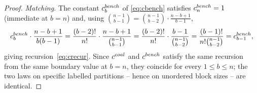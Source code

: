 \documentclass[10pt,a4paper]{amsart}
\begin{document}
\begin{proof}
\emph{Matching.} The constant \(c_b^{\rm bench}\) of \eqref{eq:cbench} satisfies \(c_n^{\rm bench}=1\) (immediate at \(b=n\)) and, using  \(\binom{n-1}{b-1}=\binom{n-1}{b-2}\cdot\frac{n-b+1}{b-1}\),
\[
c_b^{\rm bench}\cdot\frac{n-b+1}{b(b-1)}
=\frac{(b-2)!}{n!}\cdot\frac{n-b+1}{\binom{n-1}{b-1}}
=\frac{(b-2)!}{n!}\cdot\frac{b-1}{\binom{n-1}{b-2}}
=\frac{(b-1)!}{n!\binom{n-1}{b-2}}=c_{b-1}^{\rm bench},
\]
giving recursion~\eqref{eq:crecur}. Since \(c^{\rm coal}\) and \(c^{\rm bench}\) satisfy the same recursion from the same boundary value at \(b=n\), they coincide for every \(1\le b\le n\); the two laws on specific labelled partitions -- hence on unordered block sizes -- are identical.
\end{proof}
\end{document}
